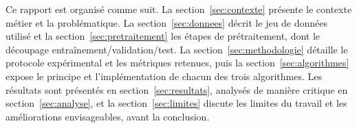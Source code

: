 Ce rapport est organisé comme suit. La section~\ref{sec:contexte} présente le
contexte métier et la problématique. La section~\ref{sec:donnees} décrit le jeu
de données utilisé et la section~\ref{sec:pretraitement} les étapes de
prétraitement, dont le découpage entraînement/validation/test. La
section~\ref{sec:methodologie} détaille le protocole expérimental et les
métriques retenues, puis la section~\ref{sec:algorithmes} expose le principe et
l'implémentation de chacun des trois algorithmes. Les résultats sont présentés
en section~\ref{sec:resultats}, analysés de manière critique en
section~\ref{sec:analyse}, et la section~\ref{sec:limites} discute les limites
du travail et les améliorations envisageables, avant la conclusion.
